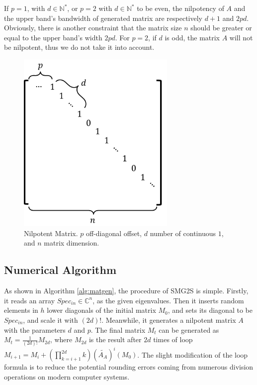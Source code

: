 If $p=1$, with $d \in \mathbb{N^*}$, or $p=2$ with $d \in \mathbb{N^*}$ to be even, the nilpotency of $A$ and the upper band's bandwidth of generated matrix are respectively $d+1$  and $2pd$. Obviously, there is another constraint that the matrix size $n$ should be greater or equal to the upper band's width $2pd$. For $p=2$, if $d$ is odd, the matrix $A$ will not be nilpotent, thus we do not take it into account.

\begin{figure}[htbp]
	\centering
	\includegraphics[width=3.0in]{fig/nilpotent_matrix.pdf}
	\caption{Nilpotent Matrix. $p$ off-diagonal offset, $d$ number of continuous $1$, and $n$ matrix dimension.}
	\label{fig:nilpotent}
\end{figure}

\subsection{Numerical Algorithm}

As shown in Algorithm \ref{alg:matgen}, the procedure of SMG2S is simple. Firstly, it reads an array $Spec_{in} \in \mathbb{C}^{n}$, as the given eigenvalues. Then it inserts random elements in $h$ lower diagonals of the initial matrix $M_0$, and sets its diagonal to be $Spec_{in}$, and scale it with $(2d)!$. Meanwhile, it generates a nilpotent matrix $A$ with the parameters $d$ and $p$. The final matrix $M_t$ can be generated as $M_t=\frac{1}{(2d)!}M_{2d}$, where $M_{2d}$ is the result after $2d$ times of loop $M_{i+1}=M_i+(\prod_{k=i+1}^{2d}k)(\widetilde{A_A})^i(M_0)$. The slight modification of the loop formula is to reduce the potential rounding errors coming from numerous division operations on modern computer systems.

